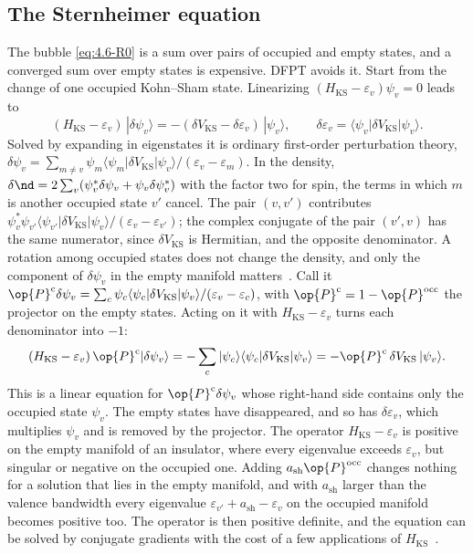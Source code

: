 \subsection{The Sternheimer equation}

The bubble \cref{eq:4.6-R0} is a sum over pairs of occupied and empty states, and a converged sum over empty states is expensive. DFPT avoids it. Start from the change of one occupied Kohn--Sham state. Linearizing $(H_{\mathrm{KS}} - \varepsilon_v)\psi_v = 0$ leads to~\cite[Eq.~(25)]{baroni2001phonons}
\begin{equation}
  (H_{\mathrm{KS}} - \varepsilon_v)\,|\delta\psi_v\rangle = -(\delta V_{\mathrm{KS}} - \delta\varepsilon_v)\,|\psi_v\rangle , \qquad \delta\varepsilon_v = \langle\psi_v|\delta V_{\mathrm{KS}}|\psi_v\rangle .
  \label{eq:5.4-lin}
\end{equation}
Solved by expanding in eigenstates it is ordinary first-order perturbation theory, $\delta\psi_v = \sum_{m\neq v}\psi_m\langle\psi_m|\delta V_{\mathrm{KS}}|\psi_v\rangle/(\varepsilon_v - \varepsilon_m)$. In the density, $\delta\nd = 2\sum_v(\psi_v^*\delta\psi_v + \psi_v\delta\psi_v^*)$ with the factor two for spin, the terms in which $m$ is another occupied state $v'$ cancel. The pair $(v,v')$ contributes $\psi_v^*\psi_{v'}\langle\psi_{v'}|\delta V_{\mathrm{KS}}|\psi_v\rangle/(\varepsilon_v - \varepsilon_{v'})$; the complex conjugate of the pair $(v',v)$ has the same numerator, since $\delta V_{\mathrm{KS}}$ is Hermitian, and the opposite denominator. A rotation among occupied states does not change the density, and only the component of $\delta\psi_v$ in the empty manifold matters~\cite[Eq.~(29)]{baroni2001phonons}. Call it $\op{P}^{\mathrm{c}}\delta\psi_v = \sum_c\psi_c\langle\psi_c|\delta V_{\mathrm{KS}}|\psi_v\rangle/(\varepsilon_v - \varepsilon_c)$, with $\op{P}^{\mathrm{c}} = 1 - \op{P}^{\mathrm{occ}}$ the projector on the empty states. Acting on it with $H_{\mathrm{KS}} - \varepsilon_v$ turns each denominator into $-1$:
\begin{equation*}
  (H_{\mathrm{KS}} - \varepsilon_v)\,\op{P}^{\mathrm{c}}|\delta\psi_v\rangle = -\sum_c|\psi_c\rangle\langle\psi_c|\delta V_{\mathrm{KS}}|\psi_v\rangle = -\op{P}^{\mathrm{c}}\,\delta V_{\mathrm{KS}}\,|\psi_v\rangle .
\end{equation*}
This is a linear equation for $\op{P}^{\mathrm{c}}\delta\psi_v$ whose right-hand side contains only the occupied state $\psi_v$. The empty states have disappeared, and so has $\delta\varepsilon_v$, which multiplies $\psi_v$ and is removed by the projector. The operator $H_{\mathrm{KS}} - \varepsilon_v$ is positive on the empty manifold of an insulator, where every eigenvalue exceeds $\varepsilon_v$, but singular or negative on the occupied one. Adding $a_{\mathrm{sh}}\op{P}^{\mathrm{occ}}$ changes nothing for a solution that lies in the empty manifold, and with $a_{\mathrm{sh}}$ larger than the valence bandwidth every eigenvalue $\varepsilon_{v'} + a_{\mathrm{sh}} - \varepsilon_v$ on the occupied manifold becomes positive too. The operator is then positive definite, and the equation can be solved by conjugate gradients with the cost of a few applications of $H_{\mathrm{KS}}$~\cite[Eq.~(30)]{baroni2001phonons}.

